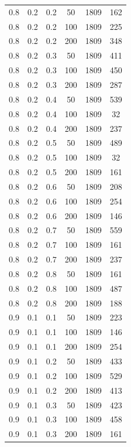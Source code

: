\documentclass[a4paper,14pt, unknownkeysallowed]{extreport}
\begin{document}
\begin{center}
\begin{longtable}[c]{|c|c|c|c|c|c|}
		0.8 &  0.2 &  0.2 &   50 &  1809 &   162 \\
		0.8 &  0.2 &  0.2 &  100 &  1809 &   225 \\
		0.8 &  0.2 &  0.2 &  200 &  1809 &   348 \\
	   \hline
		0.8 &  0.2 &  0.3 &   50 &  1809 &   411 \\
		0.8 &  0.2 &  0.3 &  100 &  1809 &   450 \\
		0.8 &  0.2 &  0.3 &  200 &  1809 &   287 \\
	   \hline
		0.8 &  0.2 &  0.4 &   50 &  1809 &   539 \\
		0.8 &  0.2 &  0.4 &  100 &  1809 &    32 \\
		0.8 &  0.2 &  0.4 &  200 &  1809 &   237 \\
	   \hline
		0.8 &  0.2 &  0.5 &   50 &  1809 &   489 \\
		0.8 &  0.2 &  0.5 &  100 &  1809 &    32 \\
		0.8 &  0.2 &  0.5 &  200 &  1809 &   161 \\
	   \hline
		0.8 &  0.2 &  0.6 &   50 &  1809 &   208 \\
		0.8 &  0.2 &  0.6 &  100 &  1809 &   254 \\
		0.8 &  0.2 &  0.6 &  200 &  1809 &   146 \\
	   \hline
		0.8 &  0.2 &  0.7 &   50 &  1809 &   559 \\
		0.8 &  0.2 &  0.7 &  100 &  1809 &   161 \\
		0.8 &  0.2 &  0.7 &  200 &  1809 &   237 \\
	   \hline
		0.8 &  0.2 &  0.8 &   50 &  1809 &   161 \\
		0.8 &  0.2 &  0.8 &  100 &  1809 &   487 \\
		0.8 &  0.2 &  0.8 &  200 &  1809 &   188 \\
	   \hline
		0.9 &  0.1 &  0.1 &   50 &  1809 &   223 \\
		0.9 &  0.1 &  0.1 &  100 &  1809 &   146 \\
		0.9 &  0.1 &  0.1 &  200 &  1809 &   254 \\
	   \hline
		0.9 &  0.1 &  0.2 &   50 &  1809 &   433 \\
		0.9 &  0.1 &  0.2 &  100 &  1809 &   529 \\
		0.9 &  0.1 &  0.2 &  200 &  1809 &   413 \\
	   \hline
		0.9 &  0.1 &  0.3 &   50 &  1809 &   423 \\
		0.9 &  0.1 &  0.3 &  100 &  1809 &   458 \\
		0.9 &  0.1 &  0.3 &  200 &  1809 &   161 \\

\end{longtable}
\end{center}
\end{document}
